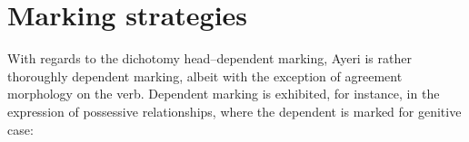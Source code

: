 % 
% 
% 
% 
% 
% 


\section{Marking strategies}
\label{sec:markstrat}

With regards to the dichotomy head--dependent marking, Ayeri is rather  
thoroughly dependent marking, albeit with the exception of agreement 
morphology on the verb. Dependent marking is exhibited, for instance, in the 
expression of possessive relationships, where the dependent is marked for 
genitive case:

